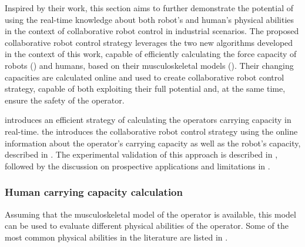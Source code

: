 Inspired by their work, this section aims to further demonstrate the potential of using the real-time knowledge about both robot's and human's physical abilities in the context of collaborative robot control in industrial scenarios. The proposed collaborative robot control strategy leverages the two new algorithms developed in the context of this work, capable of efficiently calculating the force capacity of robots () and humans, based on their musculoskeletal models (). 
Their changing capacities are calculated online and used to create collaborative robot control strategy, capable of both exploiting their full potential and, at the same time, ensure the safety of the operator. 

 introduces an efficient strategy of calculating the operators carrying capacity in real-time.  the introduces the collaborative robot control strategy using the online information about the operator's carrying capacity as well as the robot's capacity, described in  . The experimental validation of this approach is described in  , followed by the discussion on prospective applications and limitations in  .


\subsubsection{Human carrying capacity calculation}
\label{sec:human_carrying_capacity}

Assuming that the musculoskeletal model of the operator is available, this model can be used to evaluate different physical abilities of the operator. Some of the most common physical abilities in the literature are listed in . 

